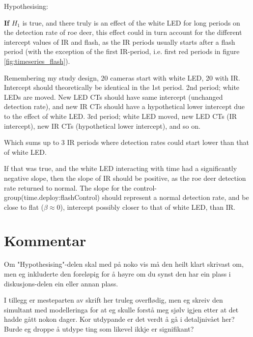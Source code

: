 Hypothesising:

\textbf{If} $H_1$ is true, and there truly is an effect of the white LED for long periods on the detection rate of roe deer, this effect could in turn account for the different intercept values of IR and flash, as the IR periods usually starts after a flash period (with the exception of the first IR-period, i.e. first red periods in figure \vref{fig:timeseries_flash}).

Remembering my study design, 20 cameras start with white LED, 20 with IR.
Intercept should theoretically be identical in the 1st period.
2nd period; white LEDs are moved. New LED CTs should have same intercept (unchanged detection rate), and new IR CTs should have a hypothetical lower intercept due to the effect of white LED.
3rd period; white LED moved, new LED CTs (IR intercept), new IR CTs (hypothetical lower intercept), and so on.

Which sums up to 3 IR periods where detection rates could start lower than that of white LED.

If that was true, and the white LED interacting with time had a significantly negative slope, then the slope of IR should be positive, as the roe deer detection rate returned to normal.
The slope for the control-group(time.deploy:flashControl) should represent a normal detection rate, and be close to flat ($ \beta \approx 0$), intercept possibly closer to that of white LED, than IR.


\section*{Kommentar}

Om "Hypothesising"-delen skal med på noko vis må den heilt klart skrivast om, men eg inkluderte den foreløpig for å høyre om du synst den har ein plass i diskusjons-delen ein eller annan plass.

I tillegg er mesteparten av skrift her truleg overflødig, men eg skreiv den simultant med modelleringa for at eg skulle forstå meg sjølv igjen etter at det hadde gått nokon dager. Kor utdypande er det verdt å gå i detaljnivået her?  Burde eg droppe å utdype ting som likevel ikkje er signifikant?









